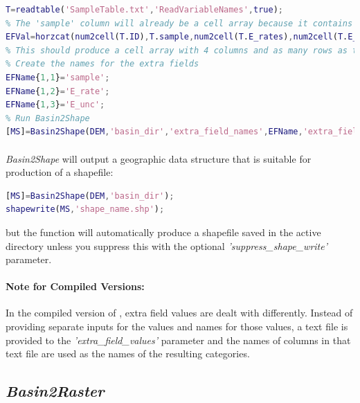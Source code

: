 \begin{lstlisting}[language=Matlab]
% Load in your text file into a table specifying that it has a header containing the variable names, this is the easiest way to import mixed data containing both characters and numbers
T=readtable('SampleTable.txt','ReadVariableNames',true);
% The 'sample' column will already be a cell array because it contains characters, but the other columns will be numeric arrays so you will need to convert them to cell arrays and then horizontally concatenate them together
EFVal=horzcat(num2cell(T.ID),T.sample,num2cell(T.E_rates),num2cell(T.E_unc));
% This should produce a cell array with 4 columns and as many rows as there are basins
% Create the names for the extra fields
EFName{1,1}='sample';
EFName{1,2}='E_rate';
EFName{1,3}='E_unc';
% Run Basin2Shape
[MS]=Basin2Shape(DEM,'basin_dir','extra_field_names',EFName,'extra_field_values',EFVal);
\end{lstlisting} 

\paragraph{}\textit{Basin2Shape} will output a geographic data structure that is suitable for production of a shapefile:

\begin{lstlisting}[language=Matlab]
[MS]=Basin2Shape(DEM,'basin_dir');
shapewrite(MS,'shape_name.shp');
\end{lstlisting}

\noindent
but the function will automatically produce a shapefile saved in the active directory unless you suppress this with the optional \textit{'suppress\_shape\_write'} parameter. 

\paragraph{Note for Compiled Versions:} In the compiled version of , extra field values are dealt with differently. Instead of providing separate inputs for the values and names for those values, a text file is provided to the \textit{'extra\_field\_values'} parameter and the names of columns in that text file are used as the names of the resulting categories. 

\subsection{\textit{Basin2Raster}}
